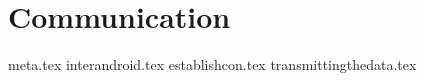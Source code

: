 \chapter{Communication}\label{cha:communication}
{meta.tex}
{interandroid.tex}
{establishcon.tex}
{transmittingthedata.tex}

